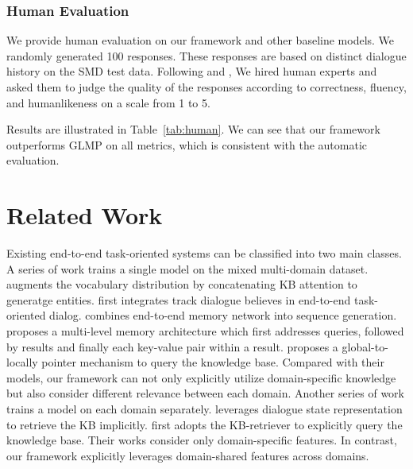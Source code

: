 \documentclass[11pt,a4paper]{article}
\begin{document}
\subsubsection{Human Evaluation}
We provide human evaluation on our framework and other baseline models.
We randomly generated 100 responses. These responses are based on distinct dialogue history on the SMD test data.
Following  and , We hired human experts and asked them to judge the quality of the responses according to correctness, fluency, and humanlikeness on a scale from 1 to 5.

Results are illustrated in Table~\ref{tab:human}.
 We can see that our framework outperforms GLMP on all metrics, which is consistent with the automatic evaluation.
 
 
\section{Related Work}
Existing end-to-end task-oriented systems can be classified into two main classes.
A series of work trains a single model on the mixed multi-domain dataset. 
 augments the vocabulary distribution by concatenating KB attention to generatge entities.
 first integrates track dialogue believes in end-to-end task-oriented dialog.
 combines end-to-end memory network \cite{DBLP:conf/nips/SukhbaatarSWF15} into sequence generation.
 proposes a multi-level memory architecture which first addresses queries, followed by results and finally each key-value pair within a result.
 proposes a global-to-locally pointer mechanism to query the knowledge base.
Compared with their models, our framework can not only explicitly utilize domain-specific knowledge but also consider different relevance between each domain.
Another series of work trains a model on each domain separately.
 leverages dialogue state representation to retrieve the KB implicitly.
 first adopts the KB-retriever to explicitly query the knowledge base. 
Their works consider only domain-specific features. In contrast, our framework explicitly leverages domain-shared features across domains.
\end{document}
